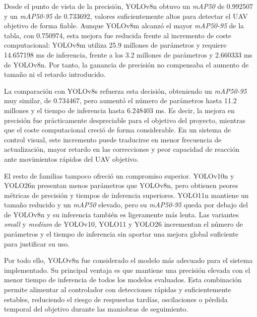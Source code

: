 Desde el punto de vista de la precisión, YOLOv8n obtuvo un \textit{mAP50} de 0.992507 y un \textit{mAP50-95} de 0.733692, valores suficientemente altos para detectar el UAV objetivo de forma fiable. Aunque YOLOv8m alcanzó el mayor \textit{mAP50-95} de la tabla, con 0.750974, esta mejora fue reducida frente al incremento de coste computacional: YOLOv8m utiliza 25.9 millones de parámetros y requiere 14.657198 ms de inferencia, frente a los 3.2 millones de parámetros y 2.660333 ms de YOLOv8n. Por tanto, la ganancia de precisión no compensaba el aumento de tamaño ni el retardo introducido.

\vspace{0.3cm}

La comparación con YOLOv8s refuerza esta decisión, obteniendo un \textit{mAP50-95} muy similar, de 0.734467, pero aumentó el número de parámetros hasta 11.2 millones y el tiempo de inferencia hasta 6.248403 ms. Es decir, la mejora en precisión fue prácticamente despreciable para el objetivo del proyecto, mientras que el coste computacional creció de forma considerable. En un sistema de control visual, este incremento puede traducirse en menor frecuencia de actualización, mayor retardo en las correcciones y peor capacidad de reacción ante movimientos rápidos del UAV objetivo.

\vspace{0.3cm}

El resto de familias tampoco ofreció un compromiso superior. YOLOv10n y YOLO26n presentan menos parámetros que YOLOv8n, pero obtienen peores métricas de precisión y tiempos de inferencia superiores. YOLO11n mantiene un tamaño reducido y un \textit{mAP50} elevado, pero su \textit{mAP50-95} queda por debajo del de YOLOv8n y su inferencia también es ligeramente más lenta. Las variantes \textit{small} y \textit{medium} de YOLOv10, YOLO11 y YOLO26 incrementan el número de parámetros y el tiempo de inferencia sin aportar una mejora global suficiente para justificar su uso.

\vspace{0.3cm}

Por todo ello, YOLOv8n fue considerado el modelo más adecuado para el sistema implementado. Su principal ventaja es que mantiene una precisión elevada con el menor tiempo de inferencia de todos los modelos evaluados. Esta combinación permite alimentar al controlador con detecciones rápidas y suficientemente estables, reduciendo el riesgo de respuestas tardías, oscilaciones o pérdida temporal del objetivo durante las maniobras de seguimiento.


